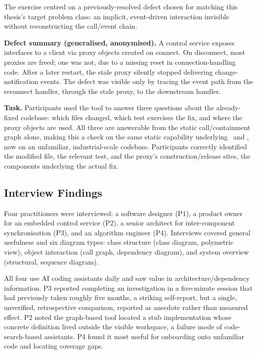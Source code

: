 The exercise centred on a previously-resolved defect chosen for matching
this thesis's target problem class: an implicit, event-driven
interaction invisible without reconstructing the call/event chain.

\textbf{Defect summary (generalised, anonymised).} A control service
exposes interfaces to a client via proxy objects created on connect. On
disconnect, most proxies are freed; one was not, due to a missing reset
in connection-handling code. After a later restart, the stale proxy
silently stopped delivering change-notification events. The defect was
visible only by tracing the event path from the reconnect handler,
through the stale proxy, to the downstream handler.

\textbf{Task.} Participants used the tool to answer three questions
about the already-fixed codebase: which files changed, which test
exercises the fix, and where the proxy objects are used. All three are
answerable from the static call/containment graph alone, making this a
check on the same static capability underlying \rqone\ and \rqtwo, now
on an unfamiliar, industrial-scale codebase. Participants correctly
identified the modified file, the relevant test, and the proxy's
construction/release sites, the components underlying the actual fix.

\subsection{Interview Findings}\label{sec:interview-findings}

Four practitioners were interviewed: a software designer (P1), a product
owner for an embedded control service (P2), a senior architect for
inter-component synchronisation (P3), and an algorithm engineer (P4).
Interviews covered general usefulness and six diagram types: class
structure (class diagram, polymetric view), object interaction (call
graph, dependency diagram), and system overview (structural, sequence
diagram).

All four use AI coding assistants daily and saw value in
architecture/dependency information. P3 reported completing an
investigation in a five-minute session that had previously taken roughly
five months, a striking self-report, but a single, unverified,
retrospective comparison, reported as anecdote rather than measured
effect. P2 noted the graph-based tool located a stub implementation
whose concrete definition lived outside the visible workspace, a failure
mode of code-search-based assistants. P4 found it most useful for
onboarding onto unfamiliar code and locating coverage gaps.

